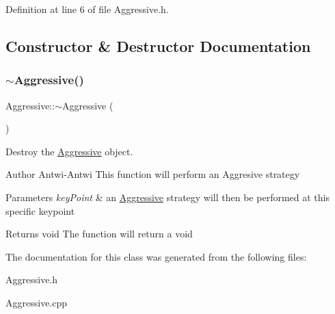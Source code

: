 Definition at line 6 of file Aggressive.\+h.



\subsection{Constructor \& Destructor Documentation}
\mbox{\label{classAggressive_a41f26c922a9794bdf223407201ab4bdd}} 
\subsubsection{\texorpdfstring{$\sim$\+Aggressive()}{~Aggressive()}}
{\footnotesize\ttfamily Aggressive\+::$\sim$\+Aggressive (\begin{DoxyParamCaption}{ }\end{DoxyParamCaption})}



Destroy the \hyperlink{classAggressive}{Aggressive} object. 

\begin{DoxyAuthor}{Author}
Antwi-\/\+Antwi This function will perform an Aggresive strategy 
\end{DoxyAuthor}

\begin{DoxyParams}{Parameters}
{\em key\+Point} & an \hyperlink{classAggressive}{Aggressive} strategy will then be performed at this specific keypoint \\
\hline
\end{DoxyParams}
\begin{DoxyReturn}{Returns}
void The function will return a void 
\end{DoxyReturn}


The documentation for this class was generated from the following files\+:\begin{DoxyCompactItemize}
\item 
Aggressive.\+h\item 
Aggressive.\+cpp\end{DoxyCompactItemize}
